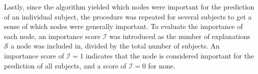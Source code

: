 Lastly, since the algorithm yielded which nodes were important for the prediction of an individual subject, the procedure was repeated for several subjects to get a sense of which nodes were generally important. To evaluate the importance of each node, an importance score $\mathcal{I}$ was introduced as the number of explanations $\mathcal{S}$ a node was included in, divided by the total number of subjects. An importance score of $\mathcal{I}=1$ indicates that the node is considered important for the prediction of all subjects, and a score of $\mathcal{I}=0$ for none.  